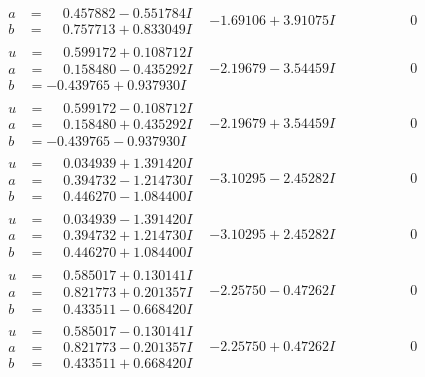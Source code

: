 \documentclass[1p]{elsarticle_modified}
\theoremstyle{definition}
\begin{document}
$$\begin{array}{c|c|c}
\begin{aligned}
a &= \phantom{-}0.457882 - 0.551784 I \\
b &= \phantom{-}0.757713 + 0.833049 I\end{aligned}
 & -1.69106 + 3.91075 I & \phantom{-0.000000 } 0 \\ \hline\begin{aligned}
u &= \phantom{-}0.599172 + 0.108712 I \\
a &= \phantom{-}0.158480 - 0.435292 I \\
b &= -0.439765 + 0.937930 I\end{aligned}
 & -2.19679 - 3.54459 I & \phantom{-0.000000 } 0 \\ \hline\begin{aligned}
u &= \phantom{-}0.599172 - 0.108712 I \\
a &= \phantom{-}0.158480 + 0.435292 I \\
b &= -0.439765 - 0.937930 I\end{aligned}
 & -2.19679 + 3.54459 I & \phantom{-0.000000 } 0 \\ \hline\begin{aligned}
u &= \phantom{-}0.034939 + 1.391420 I \\
a &= \phantom{-}0.394732 - 1.214730 I \\
b &= \phantom{-}0.446270 - 1.084400 I\end{aligned}
 & -3.10295 - 2.45282 I & \phantom{-0.000000 } 0 \\ \hline\begin{aligned}
u &= \phantom{-}0.034939 - 1.391420 I \\
a &= \phantom{-}0.394732 + 1.214730 I \\
b &= \phantom{-}0.446270 + 1.084400 I\end{aligned}
 & -3.10295 + 2.45282 I & \phantom{-0.000000 } 0 \\ \hline\begin{aligned}
u &= \phantom{-}0.585017 + 0.130141 I \\
a &= \phantom{-}0.821773 + 0.201357 I \\
b &= \phantom{-}0.433511 - 0.668420 I\end{aligned}
 & -2.25750 - 0.47262 I & \phantom{-0.000000 } 0 \\ \hline\begin{aligned}
u &= \phantom{-}0.585017 - 0.130141 I \\
a &= \phantom{-}0.821773 - 0.201357 I \\
b &= \phantom{-}0.433511 + 0.668420 I\end{aligned}
 & -2.25750 + 0.47262 I & \phantom{-0.000000 } 0 \\ \hline\begin{aligned}

\end{aligned}
\end{array}$$
\end{document}
